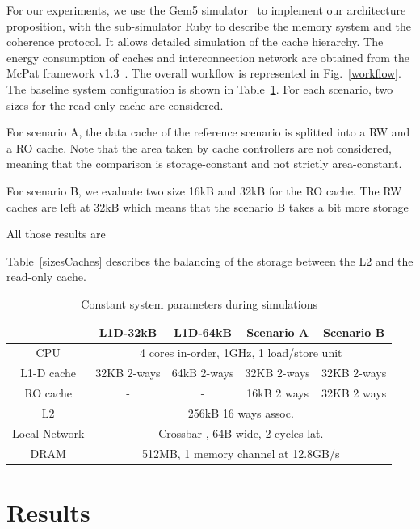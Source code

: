\documentclass[sigconf]{acmart}
\begin{document}
For our experiments, we use the Gem5 simulator~\cite{Binkert:2011} to
implement our architecture proposition, with the sub-simulator Ruby to
describe the memory system and the coherence protocol. It allows
detailed simulation of the cache hierarchy. The energy consumption of
caches and interconnection network are obtained from the McPat
framework v1.3~\cite{Li:2009}. The overall workflow is
represented in Fig.~\ref{workflow}. The baseline system
configuration is shown in Table~\ref{designs}. For each scenario, two
sizes for the read-only cache are considered. 


For scenario A, the data cache of the reference scenario is splitted into a RW and a RO cache. Note that the area taken by cache controllers are not
considered, meaning that the comparison is storage-constant and not
strictly area-constant.

For scenario B, we evaluate two size 16kB and 32kB for the RO cache. The RW caches are left at 32kB which means that the scenario B takes a bit more storage 

All those results are 

Table~\ref{sizesCaches}
describes the balancing of the storage between the L2 and the
read-only cache. 

\begin{table}
\centering
\caption{Constant system parameters during simulations}
\label{designs}
\begin{tabular}{ | c | c | c | c | c |}
\hline
\hline
 & L1D-32kB &  L1D-64kB & Scenario A & Scenario B \\
\hline
CPU & \multicolumn{4}{|c|}{4 cores in-order, 1GHz, 1 load/store unit}\\
\hline
L1-D cache & 32KB 2-ways& 64kB 2-ways&32KB 2-ways&32KB 2-ways\\
\hline
RO cache & - & - & 16kB 2 ways& 32KB 2 ways\\
\hline
L2 & \multicolumn{4}{|c|}{256kB 16 ways assoc.}\\
\hline
Local Network& \multicolumn{4}{|c|}{Crossbar , 64B wide, 2 cycles lat.}\\
\hline
DRAM  & \multicolumn{4}{|c|}{512MB, 1 memory channel at 12.8GB/s}\\
\hline
\hline
\end{tabular}
\end{table}


\section{Results}
\end{document}
